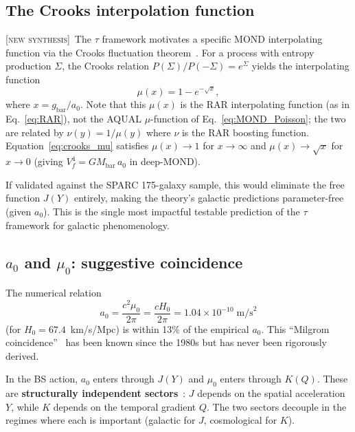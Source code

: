 \documentclass[prd,twocolumn,superscriptaddress,longbibliography,floatfix]{revtex4-2}
\newcommand{\tauasym}{\tau}
\newcommand{\new}{\textsc{[new synthesis]}}
\begin{document}
\subsection{The Crooks interpolation function}
\label{sec:crooks}

\new\  The $\tauasym$ framework motivates a specific MOND
interpolating function via the Crooks fluctuation
theorem~\cite{Crooks1999}.  For a process with entropy production
$\Sigma$, the Crooks relation $P(\Sigma)/P(-\Sigma) = e^\Sigma$
yields the interpolating function
\begin{equation}
\mu(x) = 1 - e^{-\sqrt{x}},
\label{eq:crooks_mu}
\end{equation}
where $x = g_{\mathrm{bar}}/a_0$.
Note that this $\mu(x)$ is the RAR interpolating function
(as in Eq.~\eqref{eq:RAR}), not the AQUAL $\mu$-function of
Eq.~\eqref{eq:MOND_Poisson}; the two are related by
$\nu(y) = 1/\mu(y)$ where $\nu$ is the RAR boosting function.
Equation~\eqref{eq:crooks_mu} satisfies $\mu(x) \to 1$ for
$x \to \infty$ and $\mu(x) \to \sqrt{x}$ for $x \to 0$
(giving $V_f^4 = GM_{\mathrm{bar}}\,a_0$ in deep-MOND).

If validated against the SPARC 175-galaxy sample, this would
eliminate the free function $J(Y)$ entirely, making the
theory's galactic predictions parameter-free (given $a_0$).
This is the single most impactful testable prediction of
the $\tauasym$ framework for galactic phenomenology.

\subsection{$a_0$ and $\mu_0$: suggestive coincidence}
\label{sec:a0_mu}

The numerical relation
\begin{equation}
a_0 = \frac{c^2\mu_0}{2\pi} = \frac{cH_0}{2\pi}
= 1.04 \times 10^{-10}\;\mathrm{m/s}^2
\label{eq:a0_mu0}
\end{equation}
(for $H_0 = 67.4$~km/s/Mpc) is within 13\% of the empirical $a_0$.  This ``Milgrom
coincidence''~\cite{Milgrom1999} has been known since the 1980s
but has never been rigorously derived.

In the BS action, $a_0$ enters through $J(Y)$ and $\mu_0$
enters through $K(Q)$.  These are \textbf{structurally
independent sectors}~\cite{BS2024}: $J$ depends on the spatial
acceleration $Y$, while $K$ depends on the temporal gradient $Q$.
The two sectors decouple in the regimes where each is important
(galactic for $J$, cosmological for $K$).
\end{document}
